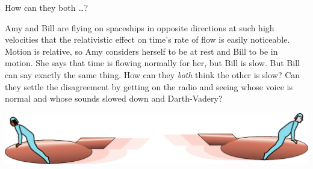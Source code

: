 \begin{frame}{How can they both \ldots ?}


      \dq

      Amy and Bill are flying on spaceships in opposite directions at such high velocities that
the relativistic effect on time's rate of flow is easily noticeable.
Motion is relative, so Amy considers herself to be at rest and Bill to be in motion. She says that
time is flowing normally for her, but Bill is slow. But Bill can say exactly the same thing.
How can they \emph{both} think the other is slow? Can they settle the disagreement by getting
on the radio and seeing whose voice is normal and whose sounds slowed down and Darth-Vadery?

    \includegraphics[width=6in]{ch02/figs/darth-vadery}


\end{frame}

